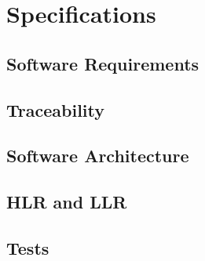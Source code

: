 \section{Specifications}

\subsection{Software Requirements}

\subsection{Traceability}

\subsection{Software Architecture}

\subsection{HLR and LLR}

\subsection{Tests}

\newpage
